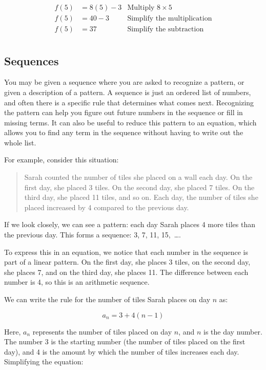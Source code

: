 \documentclass[12pt]{article}
\begin{document}
\begin{align*}
  f(5) & = 8(5) - 3 & \text{Multiply } 8 \times 5        \\
  f(5) & = 40 - 3   & \text{Simplify the multiplication} \\
  f(5) & = 37       & \text{Simplify the subtraction}    \\
\end{align*}

\subsection{Sequences}

You may be given a sequence where you are asked to recognize a pattern, or given
a description of a pattern. A sequence is just an ordered list of numbers, and
often there is a specific rule that determines what comes next. Recognizing the
pattern can help you figure out future numbers in the sequence or fill in
missing terms. It can also be useful to reduce this pattern to an equation,
which allows you to find any term in the sequence without having to write out
the whole list.

For example, consider this situation:

\begin{quote}
  Sarah counted the number of tiles she placed on a wall each day. On the first
  day, she placed 3 tiles. On the second day, she placed 7 tiles. On the third
  day, she placed 11 tiles, and so on. Each day, the number of tiles she placed
  increased by 4 compared to the previous day.
\end{quote}

If we look closely, we can see a pattern: each day Sarah places 4 more tiles
than the previous day. This forms a sequence: 3, 7, 11, 15,~\ldots.

To express this in an equation, we notice that each number in the sequence is
part of a linear pattern. On the first day, she places 3 tiles, on the second
day, she places 7, and on the third day, she places 11. The difference between
each number is 4, so this is an arithmetic sequence.

We can write the rule for the number of tiles Sarah places on day $n$ as:

\[
  a_n = 3 + 4(n - 1)
\]

Here, $a_n$ represents the number of tiles placed on day $n$, and $n$ is the day
number. The number 3 is the starting number (the number of tiles placed on the
first day), and 4 is the amount by which the number of tiles increases each day.
Simplifying the equation:
\end{document}
